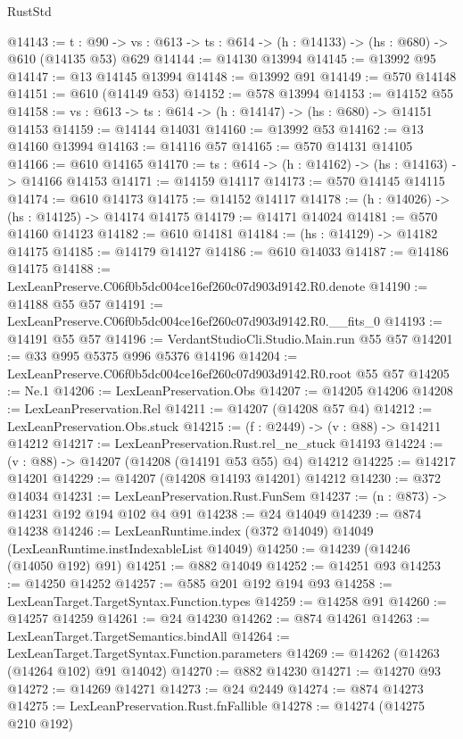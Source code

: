 \begin{lexlean}{RustStd}
\begin{coremodule}
@14143 := {t : @90} ->
  {vs : @613} -> {ts : @614} -> (h : @14133) -> (hs : @680) -> @610 (@14135 @53) @629
@14144 := @14130 @13994
@14145 := @13992 @95
@14147 := @13 @14145 @13994
@14148 := @13992 @91
@14149 := @570 @14148
@14151 := @610 (@14149 @53)
@14152 := @578 @13994
@14153 := @14152 @55
@14158 := {vs : @613} -> {ts : @614} -> (h : @14147) -> (hs : @680) -> @14151 @14153
@14159 := @14144 @14031
@14160 := @13992 @53
@14162 := @13 @14160 @13994
@14163 := @14116 @57
@14165 := @570 @14131 @14105
@14166 := @610 @14165
@14170 := {ts : @614} -> (h : @14162) -> (hs : @14163) -> @14166 @14153
@14171 := @14159 @14117
@14173 := @570 @14145 @14115
@14174 := @610 @14173
@14175 := @14152 @14117
@14178 := (h : @14026) -> (hs : @14125) -> @14174 @14175
@14179 := @14171 @14024
@14181 := @570 @14160 @14123
@14182 := @610 @14181
@14184 := (hs : @14129) -> @14182 @14175
@14185 := @14179 @14127
@14186 := @610 @14033
@14187 := @14186 @14175
@14188 := LexLeanPreserve.C06f0b5dc004ce16ef260c07d903d9142.R0.denote
@14190 := @14188 @55 @57
@14191 := LexLeanPreserve.C06f0b5dc004ce16ef260c07d903d9142.R0.__fits_0
@14193 := @14191 @55 @57
@14196 := VerdantStudioCli.Studio.Main.run @55 @57
@14201 := @33 @995 @5375 @996 @5376 @14196
@14204 := LexLeanPreserve.C06f0b5dc004ce16ef260c07d903d9142.R0.root @55 @57
@14205 := Ne.{1}
@14206 := LexLeanPreservation.Obs
@14207 := @14205 @14206
@14208 := LexLeanPreservation.Rel
@14211 := @14207 (@14208 @57 @4)
@14212 := LexLeanPreservation.Obs.stuck
@14215 := (f : @2449) -> (v : @88) -> @14211 @14212
@14217 := LexLeanPreservation.Rust.rel_ne_stuck @14193
@14224 := (v : @88) -> @14207 (@14208 (@14191 @53 @55) @4) @14212
@14225 := @14217 @14201
@14229 := @14207 (@14208 @14193 @14201) @14212
@14230 := @372 @14034
@14231 := LexLeanPreservation.Rust.FunSem
@14237 := (n : @873) -> @14231 @192 @194 @102 @4 @91
@14238 := @24 @14049
@14239 := @874 @14238
@14246 := LexLeanRuntime.index (@372 @14049) @14049 (LexLeanRuntime.instIndexableList @14049)
@14250 := @14239 (@14246 (@14050 @192) @91)
@14251 := @882 @14049
@14252 := @14251 @93
@14253 := @14250 @14252
@14257 := @585 @201 @192 @194 @93
@14258 := LexLeanTarget.TargetSyntax.Function.types
@14259 := @14258 @91
@14260 := @14257 @14259
@14261 := @24 @14230
@14262 := @874 @14261
@14263 := LexLeanTarget.TargetSemantics.bindAll
@14264 := LexLeanTarget.TargetSyntax.Function.parameters
@14269 := @14262 (@14263 (@14264 @102) @91 @14042)
@14270 := @882 @14230
@14271 := @14270 @93
@14272 := @14269 @14271
@14273 := @24 @2449
@14274 := @874 @14273
@14275 := LexLeanPreservation.Rust.fnFallible
@14278 := @14274 (@14275 @210 @192)

\end{coremodule}
\end{lexlean}
